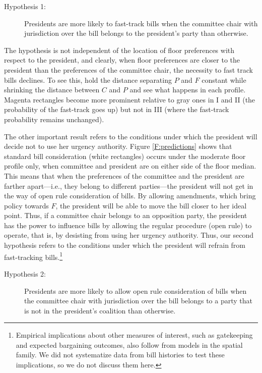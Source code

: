 \documentclass[letter,12pt]{article}
\begin{document}
\begin{description}
  \item [Hypothesis 1:] Presidents are more likely to fast-track bills when the committee chair with jurisdiction over the bill  belongs to the president's party than otherwise.
\end{description}

The hypothesis is not independent of the location of floor preferences with respect to the president, and clearly, when floor preferences are closer to the president than the preferences of the committee chair, the necessity to fast track bills declines. To see this, hold the distance separating $P$ and $F$ constant while shrinking the distance between $C$ and $P$ and see what happens in each profile. Magenta rectangles become more prominent relative to gray ones in I and II (the probability of the fast-track goes up) but not in III (where the fast-track probability remains unchanged). 

The other important result refers to the conditions under which the president will decide not to use her urgency authority.  Figure \ref{F:predictions} shows that standard bill consideration (white rectangles) occurs under the moderate floor profile only, when committee and president are on either side of the floor median. This means that when the preferences of the committee and the president are farther apart---i.e., they belong to different parties---the president will not get in the way of open rule consideration of bills. By allowing amendments, which bring policy towards $F$, the president will be able to move the bill closer to her ideal point. Thus, if a committee chair belongs to an opposition party, the president has the power to influence bills by allowing the regular procedure (open rule) to operate, that is, by desisting from using her urgency authority. Thus, our second hypothesis refers to the conditions under which the president will refrain from fast-tracking bills.\footnote{Empirical implications about other measures of interest, such as gatekeeping and expected bargaining outcomes, also follow from models in the spatial family. We did not systematize data from bill histories to test these implications, so we do not discuss them here.} 

\begin{description}
  \item [Hypothesis 2:] Presidents are more likely to allow open rule consideration of bills when the committee chair with jurisdiction over the bill belongs to a party that is not in the president's coalition than otherwise.
\end{description}
\end{document}
